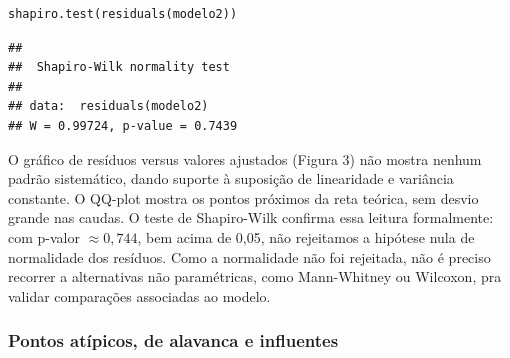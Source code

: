 \documentclass[a4paper]{modeloUFCG} %
\begin{document}
\begin{verbatim}
shapiro.test(residuals(modelo2))
\end{verbatim}

\begin{verbatim}
## 
##  Shapiro-Wilk normality test
## 
## data:  residuals(modelo2)
## W = 0.99724, p-value = 0.7439
\end{verbatim}

O gráfico de resíduos versus valores ajustados (Figura 3) não mostra nenhum padrão sistemático, dando suporte à suposição de linearidade e variância constante. O QQ-plot mostra os pontos próximos da reta teórica, sem desvio grande nas caudas. O teste de Shapiro-Wilk confirma essa leitura formalmente: com p-valor \(\approx 0{,}744\), bem acima de 0,05, não rejeitamos a hipótese nula de normalidade dos resíduos. Como a normalidade não foi rejeitada, não é preciso recorrer a alternativas não paramétricas, como Mann-Whitney ou Wilcoxon, pra validar comparações associadas ao modelo.

\subsubsection{Pontos atípicos, de alavanca e influentes}\label{pontos-atuxedpicos-de-alavanca-e-influentes}
\end{document}
